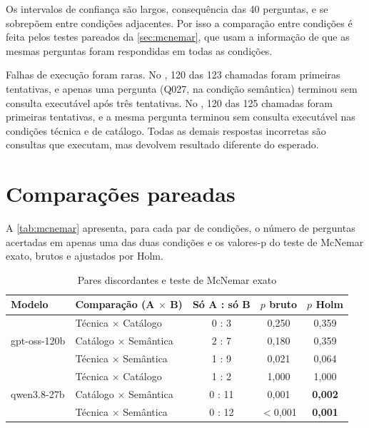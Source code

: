 Os intervalos de confiança são largos, consequência das 40 perguntas, e se
sobrepõem entre condições adjacentes. Por isso a comparação entre condições
é feita pelos testes pareados da \autoref{sec:mcnemar}, que usam a
informação de que as mesmas perguntas foram respondidas em todas as
condições.

Falhas de execução foram raras. No , 120 das 123
chamadas foram primeiras tentativas, e apenas uma pergunta (Q027, na
condição semântica) terminou sem consulta executável após três tentativas.
No , 120 das 125 chamadas foram primeiras tentativas, e a
mesma pergunta terminou sem consulta executável nas condições técnica e de
catálogo. Todas as demais respostas incorretas são consultas que executam,
mas devolvem resultado diferente do esperado.

\section{Comparações pareadas}
\label{sec:mcnemar}

A \autoref{tab:mcnemar} apresenta, para cada par de condições, o número de
perguntas acertadas em apenas uma das duas condições e os valores-p do
teste de McNemar exato, brutos e ajustados por Holm.

\begin{table}[htb]
  \centering
  \caption{Pares discordantes e teste de McNemar exato}
  \label{tab:mcnemar}
  \begin{tabular}{llccc}
    \toprule
    Modelo & Comparação (A $\times$ B) & Só A : só B & $p$ bruto & $p$ Holm \\
    \midrule
    \multirow{3}{*}{gpt-oss-120b}
      & Técnica $\times$ Catálogo  & 0 : 3 & 0,250 & 0,359 \\
      & Catálogo $\times$ Semântica & 2 : 7 & 0,180 & 0,359 \\
      & Técnica $\times$ Semântica  & 1 : 9 & 0,021 & 0,064 \\
    \midrule
    \multirow{3}{*}{qwen3.8-27b}
      & Técnica $\times$ Catálogo  & 1 : 2  & 1,000 & 1,000 \\
      & Catálogo $\times$ Semântica & 0 : 11 & 0,001 & \textbf{0,002} \\
      & Técnica $\times$ Semântica  & 0 : 12 & $<$0,001 & \textbf{0,001} \\
    \bottomrule
  \end{tabular}
\end{table}

